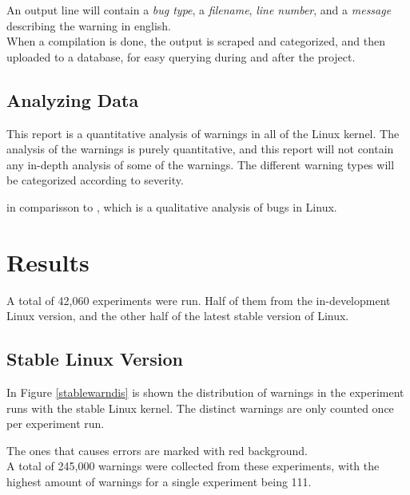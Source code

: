 \documentclass[a4paper,11pt]{report}
\begin{document}
An output line will contain a \emph{bug type}, a \emph{filename}, \emph{line 
number}, and a \emph{message} describing the warning in english.
\\

When a compilation is done, the output is scraped and categorized, and then 
uploaded to a database, for easy querying during and after the project. 


            \section{Analyzing Data}
This report is a quantitative analysis of warnings in all of the Linux kernel.
The analysis of the warnings is purely quantitative, and this report will not 
contain any in-depth analysis of some of the warnings. The different warning 
types will be categorized according to severity.

in comparisson to\cite{42bugs} , which 
is a qualitative analysis of bugs in Linux.




\newpage
\chapter{Results}

A total of 42,060 experiments were run. Half of them from the 
in-development Linux version, and the other half of the latest stable version 
of Linux.
\\


            \section{Stable Linux Version}
In Figure \ref{stablewarndis} is shown the distribution of warnings in the 
experiment runs with the stable Linux kernel. The distinct warnings are only 
counted once per experiment run.

The ones that causes errors are marked with red background.
\\

A total of 245,000 warnings were collected from these experiments, with the 
highest amount of warnings for a single experiment being 111.
\\
\end{document}
